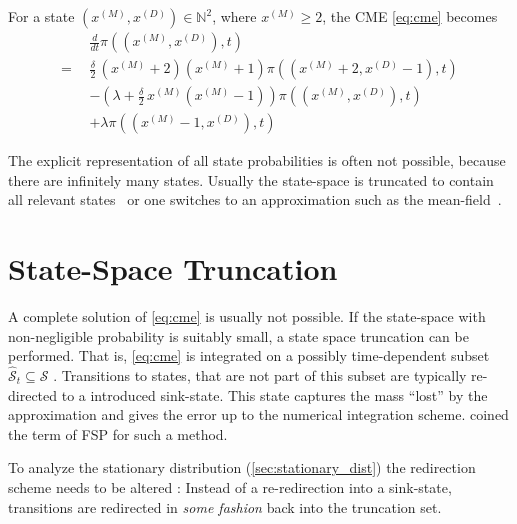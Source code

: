 \begin{example}
\begin{figure}[h!]
\end{figure}

For a state $(x^{(M)}, x^{(D)})\in\mathbb{N}^2$, where $x^{(M)}\geq 2$,
the \ac{CME} \eqref{eq:cme} becomes
\begin{align*}
	& \frac{d}{dt}\pi((x^{(M)}, x^{(D)}), t)\\
	= \;\,&  \frac{\delta}{2} \, (x^{(M)}+2) (x^{(M)} + 1) \pi((x^{(M)}+2, x^{(D)}-1), t)\\
	& - (\lambda + \frac{\delta}{2} \, x^{(M)} (x^{(M)} - 1))\pi((x^{(M)}, x^{(D)}), t)\\
	& + \lambda \pi((x^{(M)}-1, x^{(D)}), t)
\end{align*}
\end{example}

The explicit representation of all state probabilities is often not possible, because
there are infinitely many states. Usually the state-space is truncated to contain all
relevant states~\cite{andreychenko2011parameter} or one switches to
an approximation such as the mean-field~\cite{bortolussi2013}.


\section{State-Space Truncation}\label{sec:fsp}
A complete solution of \eqref{eq:cme} is usually not possible.
If the state-space with non-negligible probability is suitably small, a state space
truncation can be performed.
That is, \eqref{eq:cme} is integrated on a possibly time-dependent subset
$\hat{\mathcal{S}}_t\subseteq\mathcal{S}$ \cite{henzinger2009sliding,munsky2006finite,spieler2014numerical}.
Transitions to states, that are not part of this subset are typically re-directed to a introduced sink-state.
This state captures the mass ``lost'' by the approximation and gives the error up to the numerical integration scheme.
\citet{munsky2006finite} coined the term of \acf{FSP} for such a method.

To analyze the stationary distribution (\autoref{sec:stationary_dist}) the redirection scheme needs to be altered \cite{kuntz2021stationary}:
Instead of a re-redirection into a sink-state, transitions are redirected in \emph{some fashion} back into the truncation set.

